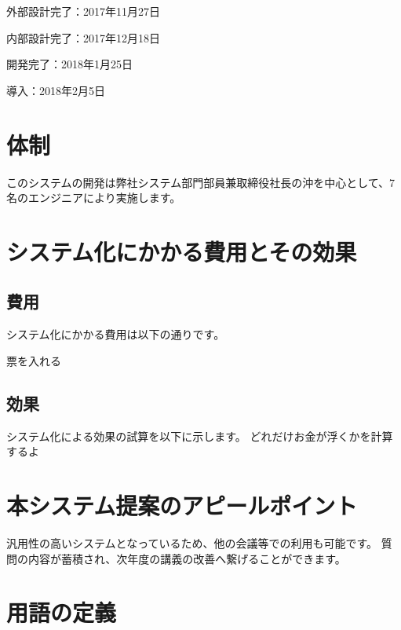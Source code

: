 \documentclass[a4j,titlepage]{ujarticle}
\begin{document}
外部設計完了：2017年11月27日

内部設計完了：2017年12月18日

開発完了：2018年1月25日

導入：2018年2月5日
\section{体制}
このシステムの開発は弊社システム部門部員兼取締役社長の沖を中心として、7名のエンジニアにより実施します。
\section{システム化にかかる費用とその効果}
\subsection{費用}
システム化にかかる費用は以下の通りです。

票を入れる


\subsection{効果}
システム化による効果の試算を以下に示します。
どれだけお金が浮くかを計算するよ

\section{本システム提案のアピールポイント}
汎用性の高いシステムとなっているため、他の会議等での利用も可能です。
質問の内容が蓄積され、次年度の講義の改善へ繋げることができます。
\section{用語の定義}
\newpage
\end{document}
